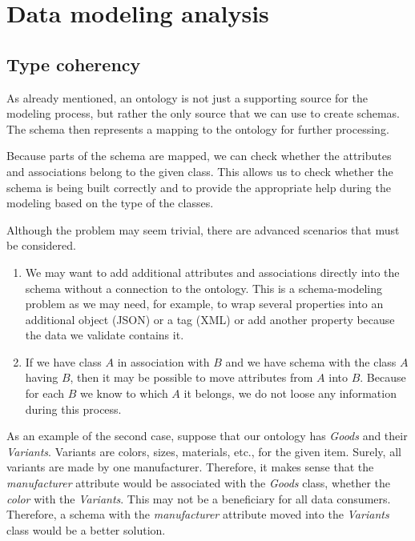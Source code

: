 \section{Data modeling analysis}

\subsection{Type coherency}

As already mentioned, an ontology is not just a supporting source for the modeling process, but rather the only source that we can use to create schemas. The schema then represents a mapping to the ontology for further processing.

Because parts of the schema are mapped, we can check whether the attributes and associations belong to the given class. This allows us to check whether the schema is being built correctly and to provide the appropriate help during the modeling based on the type of the classes.

Although the problem may seem trivial, there are advanced scenarios that must be considered.

\begin{enumerate}
  \item We may want to add additional attributes and associations directly into the schema without a connection to the ontology. This is a schema-modeling problem as we may need, for example, to wrap several properties into an additional object (JSON) or a tag (XML) or add another property because the data we validate contains it.
  \item If we have class $A$ in association with $B$ and we have schema with the class $A$ having $B$, then it may be possible to move attributes from $A$ into $B$. Because for each $B$ we know to which $A$ it belongs, we do not loose any information during this process.
\end{enumerate}

As an example of the second case, suppose that our ontology has \textit{Goods} and their \textit{Variants}. Variants are colors, sizes, materials, etc., for the given item. Surely, all variants are made by one manufacturer. Therefore, it makes sense that the \textit{manufacturer} attribute would be associated with the \textit{Goods} class, whether the \textit{color} with the \textit{Variants}. This may not be a beneficiary for all data consumers. Therefore, a schema with the \textit{manufacturer} attribute moved into the \textit{Variants} class would be a better solution.

